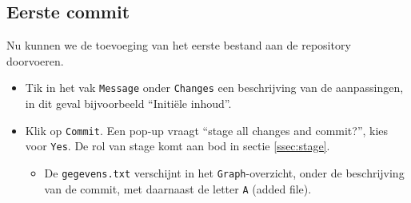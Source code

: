 \documentclass[kulak]{kulakarticle} %
\begin{document}
	\subsection{Eerste commit} Nu kunnen we de toevoeging van het eerste bestand aan de repository doorvoeren. 
	\begin{itemize}
		\item Tik in het vak \texttt{Message} onder \texttt{Changes} een beschrijving van de aanpassingen, in dit geval bijvoorbeeld ``Initiële inhoud''.
		\item Klik op \texttt{Commit}. Een pop-up vraagt ``stage all changes and commit?'', kies voor \texttt{Yes}. De rol van stage komt aan bod in sectie \ref{ssec:stage}.
		\begin{itemize}
			\item De \texttt{gegevens.txt} verschijnt in het \texttt{Graph}-overzicht, onder de beschrijving van de commit, met daarnaast de letter \texttt{A} (added file).
		\end{itemize}
	\end{itemize}
	
\end{document}
